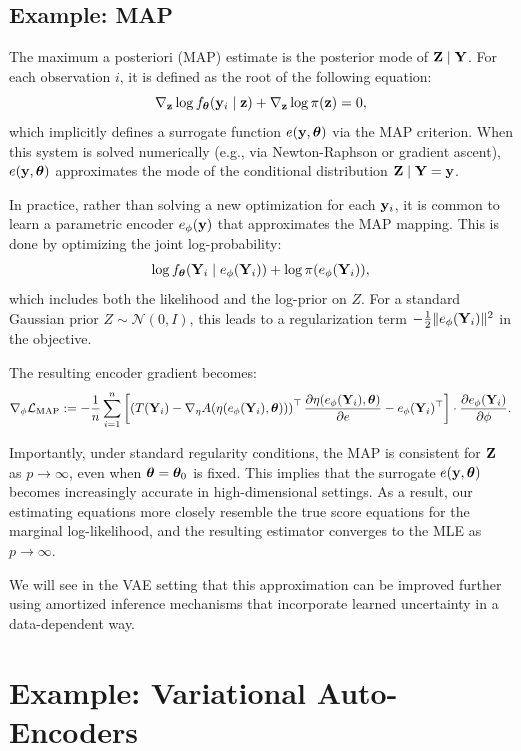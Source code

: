 \documentclass[twoside,11pt]{article}
\begin{document}
\subsection{Example: MAP}

The maximum a posteriori (MAP) estimate is the posterior mode of \( {\bf Z} \mid {\bf Y} \). For each observation \( i \), it is defined as the root of the following equation:
\[
\nabla_{{\bf z}} \log f_{\bm{\theta}}({\bf y}_i \mid {\bf z}) + \nabla_{{\bf z}} \log \pi({\bf z}) = 0,
\]
which implicitly defines a surrogate function \( e({\bf y}, {\bm{\theta}}) \) via the MAP criterion. When this system is solved numerically (e.g., via Newton-Raphson or gradient ascent), \( e({\bf y}, {\bm{\theta}}) \) approximates the mode of the conditional distribution \( {\bf Z} \mid {\bf Y} = {\bf y} \).

In practice, rather than solving a new optimization for each \( {\bf y}_i \), it is common to learn a parametric encoder \( e_\phi({\bf y}) \) that approximates the MAP mapping. This is done by optimizing the joint log-probability:
\[
\log f_{\bm{\theta}}({\bf Y}_i \mid e_\phi({\bf Y}_i)) + \log \pi(e_\phi({\bf Y}_i)),
\]
which includes both the likelihood and the log-prior on \( Z \). For a standard Gaussian prior \( Z \sim \mathcal{N}(0, I) \), this leads to a regularization term \( -\frac{1}{2} \|e_\phi({\bf Y}_i)\|^2 \) in the objective.

The resulting encoder gradient becomes:
\[
\nabla_\phi \mathcal{L}_{\text{MAP}} := -\frac{1}{n} \sum_{i=1}^n 
\left[ 
\left( T({\bf Y}_i) - \nabla_\eta A(\eta(e_\phi({\bf Y}_i), {\bm{\theta}})) \right)^\top 
\frac{\partial \eta(e_\phi({\bf Y}_i), {\bm{\theta}})}{\partial e}
- e_\phi({\bf Y}_i)^\top
\right] 
\cdot \frac{\partial e_\phi({\bf Y}_i)}{\partial \phi}.
\]

Importantly, under standard regularity conditions, the MAP is consistent for \( {\bf Z} \) as \( p \to \infty \), even when \( {\bm{\theta}} = {\bm{\theta}}_0 \) is fixed. This implies that the surrogate \( e({\bf y}, {\bm{\theta}}) \) becomes increasingly accurate in high-dimensional settings. As a result, our estimating equations more closely resemble the true score equations for the marginal log-likelihood, and the resulting estimator converges to the MLE as \(p \to \infty \).

We will see in the VAE setting that this approximation can be improved further using amortized inference mechanisms that incorporate learned uncertainty in a data-dependent way.


\section{Example: Variational Auto-Encoders}
\end{document}
